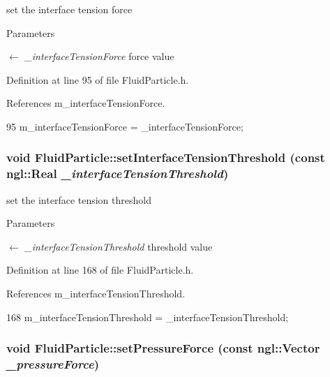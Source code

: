 set the interface tension force 


\begin{DoxyParams}{Parameters}
\item[\mbox{$\leftarrow$} {\em \_\-interfaceTensionForce}]force value \end{DoxyParams}


Definition at line 95 of file FluidParticle.h.



References m\_\-interfaceTensionForce.




\begin{DoxyCode}
95 { m_interfaceTensionForce = _interfaceTensionForce; }
\end{DoxyCode}


\hypertarget{class_fluid_particle_a9cf3c861484e2487e56e68b509d67dd5}{
\subsubsection[{setInterfaceTensionThreshold}]{\setlength{\rightskip}{0pt plus 5cm}void FluidParticle::setInterfaceTensionThreshold (const ngl::Real {\em \_\-interfaceTensionThreshold})}}
\label{class_fluid_particle_a9cf3c861484e2487e56e68b509d67dd5}


set the interface tension threshold 


\begin{DoxyParams}{Parameters}
\item[\mbox{$\leftarrow$} {\em \_\-interfaceTensionThreshold}]threshold value \end{DoxyParams}


Definition at line 168 of file FluidParticle.h.



References m\_\-interfaceTensionThreshold.




\begin{DoxyCode}
168 { m_interfaceTensionThreshold = _interfaceTensionThreshold; }
\end{DoxyCode}


\hypertarget{class_fluid_particle_a5d08a37988851625883aeae32fca6a53}{
\subsubsection[{setPressureForce}]{\setlength{\rightskip}{0pt plus 5cm}void FluidParticle::setPressureForce (const ngl::Vector {\em \_\-pressureForce})}}
\label{class_fluid_particle_a5d08a37988851625883aeae32fca6a53}


